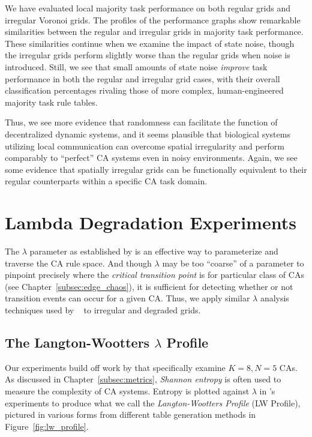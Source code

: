 \documentclass[a4paper,11pt]{article}
\begin{document}
We have evaluated local majority task performance on both regular grids and irregular Voronoi grids. The profiles of the performance graphs show remarkable similarities between the regular and irregular grids in majority task performance. These similarities continue when we examine the impact of state noise, though the irregular grids perform slightly worse than the regular grids when noise is introduced. Still, we see that small amounts of state noise \textit{improve} task performance in both the regular and irregular grid cases, with their overall classification percentages rivaling those of more complex, human-engineered majority task rule tables.

Thus, we see more evidence that randomness can facilitate the function of decentralized dynamic systems, and it seems plausible that biological systems utilizing local communication can overcome spatial irregularity and perform comparably to ``perfect'' CA systems even in noisy environments. Again, we see some evidence that spatially irregular grids can be functionally equivalent to their regular counterparts within a specific CA task domain.



\section{Lambda Degradation Experiments}
\label{sec:lambda_degen}
The $\lambda$ parameter as established by \citeauthor{la90} is an effective way to parameterize and traverse the CA rule space. And though $\lambda$ may be too ``coarse'' of a parameter to pinpoint precisely where the \textit{critical transition point} is for particular class of CAs (see Chapter~\ref{subsec:edge_chaos}), it is sufficient for detecting whether or not transition events can occur for a given CA. Thus, we apply similar $\lambda$ analysis techniques used by \citeauthor{wo90}~\cite{la90,wo90} to irregular and degraded grids.

\subsection{The Langton-Wootters $\lambda$ Profile}
Our experiments build off work by \citeauthor{wo90} that specifically examine $K=8, N=5$ CAs. As discussed in Chapter~\ref{subsec:metrics}, \textit{Shannon entropy} is often used to measure the complexity of CA systems. Entropy is plotted against $\lambda$ in \citeauthor{wo90}'s experiments to produce what we call the \textit{Langton-Wootters Profile} (LW Profile), pictured in various forms from different table generation methods in Figure~\ref{fig:lw_profile}.
\end{document}
